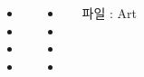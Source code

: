 \documentclass[	20pt, 
							a0paper, 
							landscape, %
							margin=0mm, %
							innermargin=4mm,  		%
							blockverticalspace=4mm, %
							colspace=5mm, 
							subcolspace=0mm
							]{tikzposter}
\begin{document}
\begin{columns}

			{
				\begin{LARGE}
					\begin{itemize}
					\item 
					\item 
					\item 
					\item 
					\end{itemize}
				\end{LARGE}
			}


			{
				\begin{LARGE}
					\begin{itemize}
					\item 
					\item 
					\item 
					\item 
					\end{itemize}
				\end{LARGE}
				파일 : Art

			}


	\end{columns}
\end{document}
